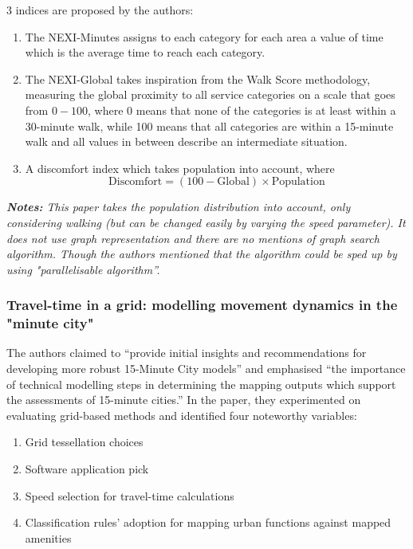 3 indices are proposed by the authors:

\begin{enumerate}
\item The NEXI-Minutes assigns to each category for each area a value of time which is the average time to reach each category.
\item The NEXI-Global takes inspiration from the Walk Score methodology, measuring the global proximity to all service categories on a scale that goes from $0 - 100$, where 0 means that none of the categories is at least within a 30-minute walk, while 100 means that all categories are within a 15-minute walk and all values in between describe an intermediate situation.
\item A discomfort index which takes population into account, where
$$\text{Discomfort} = (100-\text{Global})\times\text{Population}$$
\end{enumerate}

\textit{\textbf{Notes:} This paper takes the population distribution into account, only considering walking (but can be changed easily by varying the speed parameter). It does not use graph representation and there are no mentions of graph search algorithm. Though the authors mentioned that the algorithm could be sped up by using  "parallelisable algorithm”.}

\subsubsection{Travel-time in a grid: modelling movement dynamics in the "minute city" \texorpdfstring{\cite{Pezzica_Altafini_Mara_Chioni_2024}}{}} \label{Pezzica_Altafini_Mara_Chioni_2024}

The authors claimed to “provide initial insights and recommendations for developing more robust 15-Minute City models” and emphasised “the importance of technical modelling steps in determining the mapping outputs which support the assessments of 15-minute cities.” In the paper, they experimented on evaluating grid-based methods and identified four noteworthy variables: 

\begin{enumerate}
    \item Grid tessellation choices
    \item Software application pick
    \item Speed selection for travel-time calculations
    \item Classification rules’ adoption for mapping urban functions against mapped amenities
\end{enumerate}

